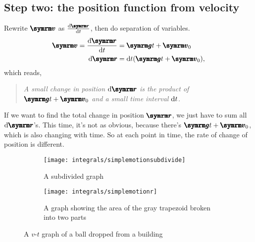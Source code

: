 \subsection{Step two: the position function from velocity}
Rewrite $\vv{v}$ as $\odv{\vv{r}}{t}$, then do separation of variables.
\begin{align}
    \vv{v} = \odv{\vv{r}}{t} &= \vv{g}t + \vv{v}_0 \label{eq:simplemotionr2} \\
    \odif{\vv{r}} &= \odif{t}(\vv{g}t + \vv{v}_0),\label{eq:simplemotionr3}
\end{align}
which reads,
\begin{quotation}
    \emph{A small change in position $\odif{\vv{r}}$ is the product of $\vv{g}t + \vv{v}_0$ and a small time interval $\odif{t}$.}
    \label{quote}
\end{quotation}
If we want to find the total change in position $\vv{r}$, we just have to sum all $\odif{\vv{r}}$'s. This time, it's not as obvious, because there's $\vv{g}t + \vv{v}_0$, which is also changing with time. So at each point in time, the rate of change of position is different.

\begin{figure}[ht]
    \centering
    \begin{subfigure}[b]{0.45\textwidth}
        \centering
        \texttt{[image: integrals/simplemotionsubdivide]}
        \caption{A subdivided graph}
        \label{fig:simplemotionsubdivided}
    \end{subfigure}
    \begin{subfigure}[b]{0.45\textwidth}
        \centering
        \texttt{[image: integrals/simplemotionr]}
        \caption{A graph showing the area of the gray trapezoid broken into two parts}
        \label{fig:simplemotionr}
    \end{subfigure}
    \caption{A $v$-$t$ graph of a ball dropped from a building}
\end{figure}


